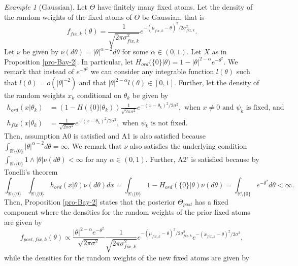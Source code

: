\documentclass{article}
\theoremstyle{plain}
\theoremstyle{remark}
\newtheorem*{example}{Example}
\begin{document}
\begin{example}[Gaussian]
	Let $\Theta$ have finitely many fixed atoms. Let the density of the random weights of the fixed atoms of $\Theta$ be Gaussian, that is
	\begin{equation*}
		f_{fix,k}(\theta)=\frac{1}{\sqrt{2\pi\sigma_{fix,k}^2}}e^{-(\mu_{fix,k}-\theta)^{2}/ 2\sigma_{fix,k}^{2}}.
	\end{equation*}
	Let $\nu$ be given by $\nu(d\theta)=|\theta|^{\alpha-2}d\theta$ for some $\alpha\in(0,1)$. Let $X$ as in Proposition \ref{pro-Bay-2}. In particular, let $H_{ord}(\{0\}|\theta)=1-|\theta|^{2-\alpha}e^{-\theta^2}$. We remark that instead of $e^{-\theta^2}$ we can consider any integrable function $l(\theta)$ such that $l(\theta)=o(|\theta|^{-2})$ and that $|\theta|^{2-\alpha}l(\theta)\in[0,1]$.
	Further, let the density of the random weights $x_{k}$ conditional on $\theta_{k}$ be given by
	\begin{align*}
		h_{ord}(x|\theta_{k})&=(1-H(\{0\}|\theta_{k}))\frac{1}{\sqrt{2\pi\sigma^2}}e^{-(x-\theta_{k})^{2}/ 2\sigma^{2}},\text{	when $x\neq0$ and $\psi_k$ is fixed, and}\\
		h_{fix}(x|\theta_{k})&=\frac{1}{\sqrt{2\pi\sigma^2}}e^{-(x-\theta_{k})^{2}/ 2\sigma^{2}},\text{ when $\psi_k$ is not fixed.}
	\end{align*}
	Then, assumption A0 is satisfied and A1 is also satisfied because $\int_{\mathbb{R}\setminus\{0\}}|\theta|^{\alpha-2}d\theta=\infty$. We remark that $\nu$ also satisfies the underlying condition $\int_{\mathbb{R}\setminus\{0\}}1\wedge|\theta|\nu(d\theta)<\infty$ for any $\alpha\in(0,1)$. Further, A2' is satisfied because by Tonelli's theorem
	\begin{equation*}
		\int_{\mathbb{R}\setminus\{0\}}\int_{\mathbb{R}\setminus\{0\}}h_{ord}(x|\theta)\nu(d\theta)dx=\int_{\mathbb{R}\setminus\{0\}}1-H_{ord}(\{0\}|\theta)\nu(d\theta)=\int_{\mathbb{R}\setminus\{0\}}e^{-\theta^2}d\theta<\infty.
	\end{equation*}
	Then, Proposition \ref{pro-Bay-2} states that the posterior $\Theta_{post}$ has a fixed component where the densities for the random weights of the prior fixed atoms are given by
	\begin{equation*}
		f_{post,fix,k}(\theta)\varpropto \frac{|\theta|^{2-\alpha}e^{-\theta^2}}{\sqrt{2\pi\sigma^2}}\frac{1}{\sqrt{2\pi\sigma_{fix,k}^2}}e^{-(\mu_{fix,k}-\theta)^{2}/ 2\sigma_{fix,k}^{2}}e^{-(x_{fix,k}-\theta)^{2}/ 2\sigma^{2}},
	\end{equation*}
	while the densities for the random weights of the new fixed atoms are given by

\end{example}
\end{document}
